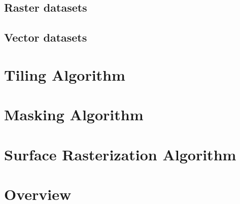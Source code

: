 \subsection{Raster datasets}


\clearpage
\subsection{Vector datasets}


\section{Tiling Algorithm}%
\label{sec:tiling-algorithm}


\section{Masking Algorithm}%
\label{sec:masking-algorithm}


\newpage
\section{Surface Rasterization Algorithm}%
\label{sec:surface-rasterization}


\clearpage
\section{Overview}%
\label{app:preprocessing-overview}%

